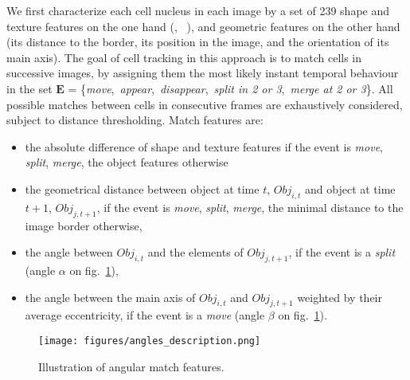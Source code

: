 We first characterize each cell nucleus in each image by a set of 239 shape and texture features on the one hand (\cite{Walter2010}, ~\cite{cellcognition}), and geometric features on the other hand (its distance to the border, its position in the image, and the orientation of its main axis). The goal of cell tracking in this approach is to match cells in successive images, by assigning them the most likely instant temporal behaviour in the set $\mathbf{E}$ = \{\textit{move},~\textit{appear},~\textit{disappear},~\textit{split in 2 or 3},~\textit{merge at 2 or 3}\}. %
All possible matches between cells in consecutive frames are exhaustively considered, subject to
distance thresholding. Match features are: 
\begin{itemize}
\item the absolute difference of shape and texture features if the event is \textit{move}, \textit{split}, \textit{merge}, the object features otherwise
\item the geometrical distance between object at time $t$, $Obj_{i, t}$ and object at time $t+1$, $Obj_{j, t+1}$, if the event is \textit{move}, \textit{split}, \textit{merge}, the minimal distance to the image border otherwise,
\item the angle between $Obj_{i, t}$ and the elements of $Obj_{j, t+1}$, if the event is a \textit{split} (angle $\alpha$ on fig.~\ref{fig:angles}),
\item the angle between the main axis of $Obj_{i, t}$ and $Obj_{j, t+1}$ weighted by their average eccentricity, if the event is a \textit{move} (angle $\beta$ on fig.~\ref{fig:angles}).
\end{itemize}

\begin{figure}[ht]
\centerline{\texttt{[image: figures/angles\_description.png]}}
\caption{Illustration of angular match features.}
\label{fig:angles}
\end{figure}


